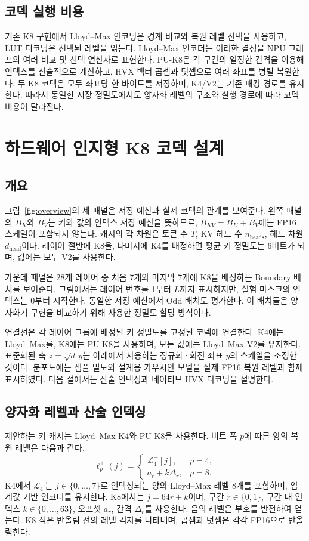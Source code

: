 \documentclass[conference,a4paper,10pt]{IEEEtran}
\begin{document}
\subsection{코덱 실행 비용}
기존 K8 구현에서 Lloyd--Max 인코딩은 경계 비교와 복원 레벨 선택을 사용하고, LUT 디코딩은 선택된 레벨을 읽는다. Lloyd--Max 인코더는 이러한 결정을 NPU 그래프의 여러 비교 및 선택 연산자로 표현한다. PU-K8은 각 구간의 일정한 간격을 이용해 인덱스를 산술적으로 계산하고, HVX 벡터 곱셈과 덧셈으로 여러 좌표를 병렬 복원한다. 두 K8 코덱은 모두 좌표당 한 바이트를 저장하며, K4/V2는 기존 패킹 경로를 유지한다. 따라서 동일한 저장 정밀도에서도 양자화 레벨의 구조와 실행 경로에 따라 코덱 비용이 달라진다.

\section{하드웨어 인지형 K8 코덱 설계}
\label{sec:method}
\subsection{개요}
그림~\ref{fig:overview}의 세 패널은 저장 예산과 실제 코덱의 관계를 보여준다. 왼쪽 패널의 $B_K$와 $B_V$는 키와 값의 인덱스 저장 예산을 뜻하므로, $B_{KV}=B_K+B_V$에는 FP16 스케일이 포함되지 않는다. 캐시의 각 차원은 토큰 수 $T$, KV 헤드 수 $n_{\mathrm{heads}}$, 헤드 차원 $d_{\mathrm{head}}$이다. 레이어 절반에 K8을, 나머지에 K4를 배정하면 평균 키 정밀도는 6비트가 되며, 값에는 모두 V2를 사용한다.

가운데 패널은 28개 레이어 중 처음 7개와 마지막 7개에 K8을 배정하는 Boundary 배치를 보여준다. 그림에서는 레이어 번호를 1부터 $L$까지 표시하지만, 실험 마스크의 인덱스는 0부터 시작한다. 동일한 저장 예산에서 Odd 배치도 평가한다. 이 배치들은 양자화기 구현을 비교하기 위해 사용한 정밀도 할당 방식이다.

연결선은 각 레이어 그룹에 배정된 키 정밀도를 고정된 코덱에 연결한다. K4에는 Lloyd--Max를, K8에는 PU-K8을 사용하며, 모든 값에는 Lloyd--Max V2를 유지한다. 표준화된 축 $z=\sqrt{d}\,y$는 아래에서 사용하는 정규화·회전 좌표 $y$의 스케일을 조정한 것이다. 분포도에는 샘플 밀도와 설계용 가우시안 모델을 실제 FP16 복원 레벨과 함께 표시하였다. 다음 절에서는 산술 인덱싱과 네이티브 HVX 디코딩을 설명한다.

\subsection{양자화 레벨과 산술 인덱싱}
제안하는 키 캐시는 Lloyd--Max K4와 PU-K8을 사용한다. 비트 폭 $p$에 따른 양의 복원 레벨은 다음과 같다.
\begin{equation}
 \boxed{\ell_p^+(j)=\begin{cases}
  \mathcal{L}_4^+[j],&p=4,\\
  a_r+k\Delta_r,&p=8.
 \end{cases}}
 \label{eq:level}
\end{equation}
K4에서 $\mathcal{L}_4^+$는 $j\in\{0,\ldots,7\}$로 인덱싱되는 양의 Lloyd--Max 레벨 8개를 포함하며, 임계값 기반 인코더를 유지한다. K8에서는 $j=64r+k$이며, 구간 $r\in\{0,1\}$, 구간 내 인덱스 $k\in\{0,\ldots,63\}$, 오프셋 $a_r$, 간격 $\Delta_r$를 사용한다. 음의 레벨은 부호를 반전하여 얻는다. K8 식은 반올림 전의 레벨 격자를 나타내며, 곱셈과 덧셈은 각각 FP16으로 반올림한다.
\end{document}
